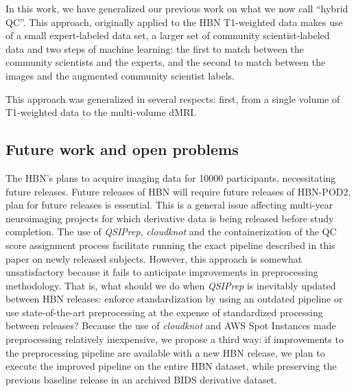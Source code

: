 \documentclass[fleqn,10pt]{wlscirep}
\begin{document}
In this work, we have generalized our previous work on what we now call ``hybrid
QC''. This approach, originally applied to the HBN T1-weighted data
\cite{keshavan2019-er} makes use of a small expert-labeled data set, a larger
set of community scientist-labeled data and two steps of machine learning: the
first to match between the community scientists and the experts, and the second
to match between the images and the augmented community scientist labels.

This approach was generalized in several respects: first, from a single volume
of T1-weighted data to the multi-volume dMRI.



\subsection*{Future work and open problems}

The HBN's plans to acquire imaging data for \num{10000} participants,
necessitating future releases. Future releases of HBN will require future
releases of HBN-POD2, plan for future releases is essential. This is a general
issue affecting multi-year neuroimaging projects for which derivative data is
being released before study completion. The use of \emph{QSIPrep},
\emph{cloudknot} and the containerization of the QC score assignment process
facilitate running the exact pipeline described in this paper on newly released
subjects. However, this approach is somewhat unsatisfactory because it fails to
anticipate improvements in preprocessing methodology. That is, what should we do
when \emph{QSIPrep} is inevitably updated between HBN releases: enforce
standardization by using an outdated pipeline or use state-of-the-art
preprocessing at the expense of standardized processing between releases?
Because the use of \emph{cloudknot} and AWS Spot Instances made preprocessing
relatively inexpensive, we propose a third way: if improvements to the
preprocessing pipeline are available with a new HBN release, we plan to execute
the improved pipeline on the entire HBN dataset, while preserving the previous
baseline release in an archived BIDS derivative dataset.
\end{document}
